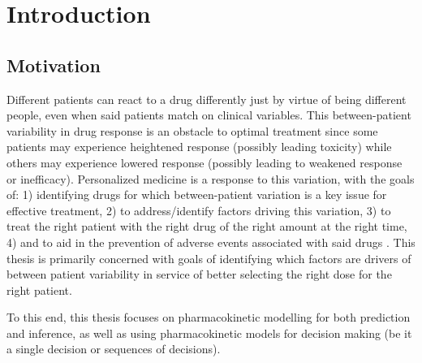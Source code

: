 \chapter{Introduction}

\section{Motivation}

Different patients can react to a drug differently just by virtue of being different people, even when said patients match on clinical variables.  This between-patient variability in drug response is an obstacle to optimal treatment since some patients may experience heightened response (possibly leading toxicity) while others may experience lowered response (possibly leading to weakened response or inefficacy).  Personalized medicine is a response to this variation, with the goals of: 1) identifying drugs for which between-patient variation is a key issue for effective treatment,  2) to address/identify factors driving this variation, 3) to treat the right patient with the right drug  of the right amount at the right time, 4) and to aid in the prevention of adverse events associated with said drugs \cite{morse2015personalized}.  This thesis is primarily concerned with goals of identifying which factors are drivers of between patient variability in service of better selecting the right dose for the right patient.

To this end, this thesis focuses on pharmacokinetic modelling for both prediction and inference, as well as using pharmacokinetic models for  decision making (be it a single decision or sequences of decisions).